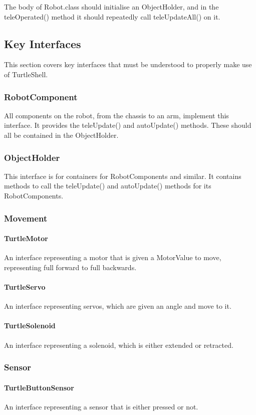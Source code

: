 \documentclass[]{report}
\begin{document}
The body of Robot.class should initialise an ObjectHolder, and in the teleOperated() method it should repeatedly call teleUpdateAll() on it.

\subsection{Key Interfaces}
This section covers key interfaces that must be understood to properly make use of TurtleShell.

\subsubsection{RobotComponent}
All components on the robot, from the chassis to an arm, implement this interface.
It provides the teleUpdate() and autoUpdate() methods.
These should all be contained in the ObjectHolder.

\subsubsection{ObjectHolder}
This interface is for containers for RobotComponents and similar.
It contains methods to call the teleUpdate() and autoUpdate() methods for its RobotComponents.

\subsubsection{Movement}
\paragraph{TurtleMotor}
An interface representing a motor that is given a MotorValue to move, representing full forward to full backwards.
\paragraph{TurtleServo}
An interface representing servos, which are given an angle and move to it.
\paragraph{TurtleSolenoid}
An interface representing a solenoid, which is either extended or retracted.

\subsubsection{Sensor}
\paragraph{TurtleButtonSensor}
An interface representing a sensor that is either pressed or not.
\end{document}
